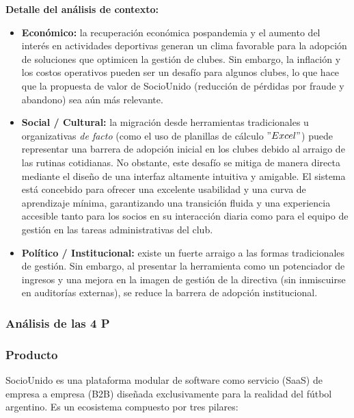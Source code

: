 \vspace{0.3cm}

\textbf{Detalle del análisis de contexto:}

\begin{itemize}
    \item \textbf{Económico:} la recuperación económica pospandemia y el aumento del interés en actividades deportivas generan un clima favorable para la adopción de soluciones que optimicen la gestión de clubes. Sin embargo, la inflación y los costos operativos pueden ser un desafío para algunos clubes, lo que hace que la propuesta de valor de SocioUnido (reducción de pérdidas por fraude y abandono) sea aún más relevante.
    \item \textbf{Social / Cultural:} la migración desde herramientas tradicionales u organizativas \textit{de facto} (como el uso de planillas de cálculo $"Excel"$) puede representar una barrera de adopción inicial en los clubes debido al arraigo de las rutinas cotidianas. No obstante, este desafío se mitiga de manera directa mediante el diseño de una interfaz altamente intuitiva y amigable. El sistema está concebido para ofrecer una excelente usabilidad y una curva de aprendizaje mínima, garantizando una transición fluida y una experiencia accesible tanto para los socios en su interacción diaria como para el equipo de gestión en las tareas administrativas del club.
    \item \textbf{Político / Institucional:} existe un fuerte arraigo a las formas tradicionales de gestión. Sin embargo, al presentar la herramienta como un potenciador de ingresos y una mejora en la imagen de gestión de la directiva (sin inmiscuirse en auditorías externas), se reduce la barrera de adopción institucional.
\end{itemize}

\newpage

\subsubsection{Análisis de las 4 P}

\subsubsection*{Producto}

SocioUnido es una plataforma modular de software como servicio (SaaS) de empresa a empresa (B2B) diseñada exclusivamente para la realidad del fútbol argentino. Es un ecosistema compuesto por tres pilares:

